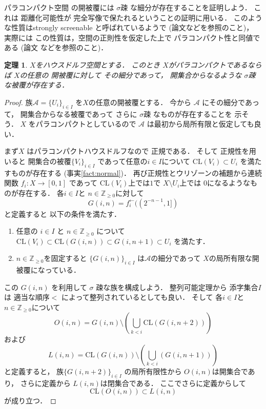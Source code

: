 \documentclass[leqno, a4paper, 12pt]{jsarticle}
\newtheorem{thm}{定理}
\newcommand{\zz}{\mathbb{Z}}
\newcommand{\cl}{\mathrm{CL}}
\newcommand{\myinv}[1]{#1^{\gets}}
\begin{document}
パラコンパクト空間
の開被覆には
$\sigma$疎
な細分が存在することを証明しよう．
これは
距離化可能性が
完全写像で保たれるということの証明に用いる．
このような性質はstrongly screenable 
と呼ばれているようで
(論文\cite{MR0070148}などを参照のこと)，
実際には
この性質は，空間の正則性を仮定した上で
パラコンパクト性と同値である
(論文
\cite{MR0056905}などを参照のこと)．
\begin{thm}\label{thm:sigmaso}
$X$をハウスドルフ空間とする．
このとき
$X$がパラコンパクトであるならば
$X$の任意の
開被覆に対して
その細分であって，
開集合からなるような
$\sigma$疎
な被覆が存在する．
\end{thm}
%
\begin{proof}
族$\mathcal{A}=\{U_{i}\}_{i\in I}$
を$X$の任意の開被覆とする．
今から
$\mathcal{A}$
にその細分であって，
開集合からなる被覆であって
さらに
$\sigma$疎
なものが存在することを
示そう．
$X$
をパラコンパクトとしているので
$\mathcal{A}$
は最初から局所有限と仮定しても良い．


まず$X$
はパラコンパクトハウスドルフなので
正規である．
そして
正規性を用いると
開集合の被覆$\{V_{i}\}_{i\in I}$
であって任意の$i\in I$について
$\cl(V_{i})\subset U_{i}$
を満たすものが存在する
(事実\ref{fact:normal})．
再び正規性とウリゾーンの補題から連続関数
$f_{i}\colon X\to [0, 1]$
であって
$\cl(V_{i})$上では$1$で
$X\setminus U_{i}$上では
$0$になるようなものが存在する．
各$i\in I$と
$n\in \zz_{\ge 0}$に対して
\[
G(i, n)=\myinv{f_{i}}((2^{-n-1}, 1])
\]
と定義すると
以下の条件を満たす．
\begin{enumerate}[label=\textup{(\arabic*)}]
\item 
任意の
$i\in I$
と
$n\in \zz_{\ge 0}$
について
$\cl(V_{i})\subset \cl(G(i, n))\subset G(i, n+1)\subset U_{i}$
を満たす．
\item 
$n\in \zz_{\ge 0}$を固定すると
$\{G(i, n)\}_{i\in I}$
は$\mathcal{A}$の細分であって
$X$の局所有限な開被覆になっている．

\end{enumerate}

この
$G(i, n)$
を利用して
$\sigma$
疎な族を構成しよう．
整列可能定理から
添字集合$I$は
適当な順序$<$
によって整列されているとしても良い．
そして
各$i\in I$と
$n\in \zz_{\ge 0}$について
\[
O(i, n)=G(i, n)
\setminus \left(\bigcup_{k<i}\cl(G(i, n+2)) \right)
\]
および
\[
L(i, n)=\cl(G(i, n))\setminus \left(\bigcup_{k<i}(G(i, n+1)) \right)
\]
と定義すると，
族$\{G(i, n+2)\}_{i\in I}$
の局所有限性から
$O(i, n)$は開集合であり，
さらに定義から
$L(i, n)$は閉集合である．
ここでさらに定義からして
\[
\cl(O(i, n))\subset L(i, n)
\]
が成り立つ．


\end{proof}
\end{document}
